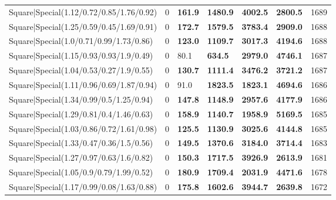 \begin{tabular}{lrllllr}
 Square|Special(1.12/0.72/0.85/1.76/0.92)                      &             0   & \textbf{161.9} & \textbf{1480.9} & \textbf{4002.5} & \textbf{2800.5} &         1689 \\
 Square|Special(1.25/0.59/0.45/1.69/0.91)                      &             0   & \textbf{172.7} & \textbf{1579.5} & \textbf{3783.4} & \textbf{2909.0} &         1688 \\
 Square|Special(1.0/0.71/0.99/1.73/0.86)                       &             0   & \textbf{123.0} & \textbf{1109.7} & \textbf{3017.3} & \textbf{4194.6} &         1688 \\
 Square|Special(1.15/0.93/0.93/1.9/0.49)                       &             0   & 80.1           & \textbf{634.5}  & \textbf{2979.0} & \textbf{4746.1} &         1687 \\
 Square|Special(1.04/0.53/0.27/1.9/0.55)                       &             0   & \textbf{130.7} & \textbf{1111.4} & \textbf{3476.2} & \textbf{3721.2} &         1687 \\
 Square|Special(1.11/0.96/0.69/1.87/0.94)                      &             0   & 91.0           & \textbf{1823.5} & \textbf{1823.1} & \textbf{4694.6} &         1686 \\
 Square|Special(1.34/0.99/0.5/1.25/0.94)                       &             0   & \textbf{147.8} & \textbf{1148.9} & \textbf{2957.6} & \textbf{4177.9} &         1686 \\
 Square|Special(1.29/0.81/0.4/1.46/0.63)                       &             0   & \textbf{158.9} & \textbf{1140.7} & \textbf{1958.9} & \textbf{5169.5} &         1685 \\
 Square|Special(1.03/0.86/0.72/1.61/0.98)                      &             0   & \textbf{125.5} & \textbf{1130.9} & \textbf{3025.6} & \textbf{4144.8} &         1685 \\
 Square|Special(1.33/0.47/0.36/1.5/0.56)                       &             0   & \textbf{149.5} & \textbf{1370.6} & \textbf{3184.0} & \textbf{3714.4} &         1683 \\
 Square|Special(1.27/0.97/0.63/1.6/0.82)                       &             0   & \textbf{150.3} & \textbf{1717.5} & \textbf{3926.9} & \textbf{2613.9} &         1681 \\
 Square|Special(1.05/0.9/0.79/1.99/0.52)                       &             0   & \textbf{180.9} & \textbf{1709.4} & \textbf{2031.9} & \textbf{4471.6} &         1678 \\
 Square|Special(1.17/0.99/0.08/1.63/0.88)                      &             0   & \textbf{175.8} & \textbf{1602.6} & \textbf{3944.7} & \textbf{2639.8} &         1672 \\

\end{tabular}
